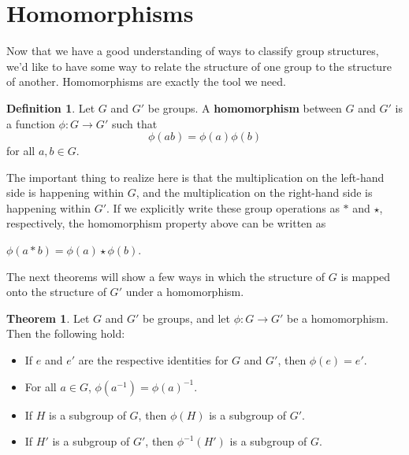 \documentclass[12pt]{article}
\newcommand{\inv}[1]{#1^{-1}}
\theoremstyle{definition}
\newtheorem{definition}{Definition}[section]
\newtheorem{theorem}{Theorem}[section]
\newenvironment{thm}
{\theoremstyle{definition}
\begin{theorem}}
{\end{theorem}}
\newenvironment{defn}[1][]
{\theoremstyle{definition}
\begin{definition}{}}
{\end{definition}}
\begin{document}
\section{Homomorphisms}

Now that we have a good understanding of ways to classify group structures, we'd like to have some way to relate the structure of one group to the structure of another. Homomorphisms are exactly the tool we need.

\begin{defn}
Let $G$ and $G'$ be groups. A \textbf{homomorphism} between $G$ and $G'$ is a function $\phi: G \to G'$ such that
\begin{equation*}
    \phi(ab) = \phi(a)\phi(b)
\end{equation*}
for all $a, b \in G$.
\end{defn}

The important thing to realize here is that the multiplication on the left-hand side is happening within $G$, and the multiplication on the right-hand side is happening within $G'$. If we explicitly write these group operations as $*$ and $\star$, respectively, the homomorphism property above can be written as

\begin{center}
    $\phi(a*b) = \phi(a) \star \phi(b)$.
\end{center}

The next theorems will show a few ways in which the structure of $G$ is mapped onto the structure of $G'$ under a homomorphism.

\begin{thm}
Let $G$ and $G'$ be groups, and let $\phi: G \to G'$ be a homomorphism. Then the following hold:
\begin{itemize}
    \item If $e$ and $e'$ are the respective identities for $G$ and $G'$, then $\phi(e) = e'$.
    \item For all $a \in G$, $\phi(\inv{a}) = \inv{\phi(a)}$.
    \item If $H$ is a subgroup of $G$, then $\phi(H)$ is a subgroup of $G'$.
    \item If $H'$ is a subgroup of $G'$, then $\inv{\phi}(H')$ is a subgroup of $G$.
\end{itemize}
\end{thm}
\end{document}
